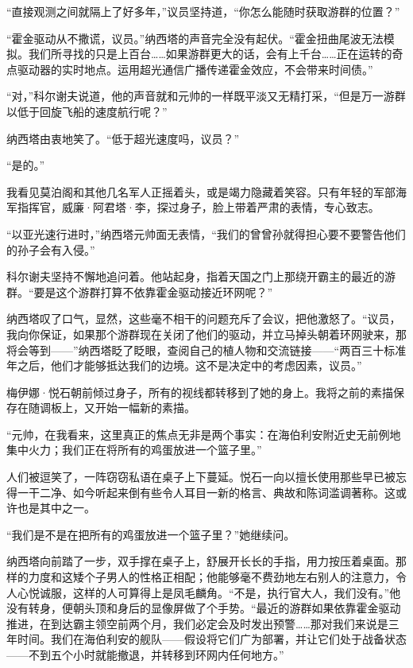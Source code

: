 \documentclass[AutoFakeBold=true]{book}
\begin{document}
``直接观测之间就隔上了好多年，''议员坚持道，``你怎么能随时获取游群的位置？''

``霍金驱动从不撒谎，议员。''纳西塔的声音完全没有起伏。``霍金扭曲尾波无法模拟。我们所寻找的只是上百台……如果游群更大的话，会有上千台……正在运转的奇点驱动器的实时地点。运用超光通信广播传递霍金效应，不会带来时间债。''

``对，''科尔谢夫说道，他的声音就和元帅的一样既平淡又无精打采，``但是万一游群以低于回旋飞船的速度航行呢？''

纳西塔由衷地笑了。``{\kaishu 低于}超光速度吗，议员？''

``是的。''

我看见莫泊阁和其他几名军人正摇着头，或是竭力隐藏着笑容。只有年轻的军部海军指挥官，威廉·阿君塔·李，探过身子，脸上带着严肃的表情，专心致志。

``以亚光速行进时，''纳西塔元帅面无表情，``我们的曾曾孙就得担心要不要警告他们的孙子会有入侵。''

科尔谢夫坚持不懈地追问着。他站起身，指着天国之门上那绕开霸主的最近的游群。``要是这个游群打算不依靠霍金驱动接近环网呢？''

纳西塔叹了口气，显然，这些毫不相干的问题充斥了会议，把他激怒了。``议员，我向你保证，如果那个游群{\kaishu 现在}关闭了他们的驱动，并{\kaishu 立马}掉头朝着环网驶来，那将会等到——''纳西塔眨了眨眼，查阅自己的植人物和交流链接——``两百三十标准年之后，他们才能够抵达我们的边境。这不是决定中的考虑因素，议员。''

梅伊娜·悦石朝前倾过身子，所有的视线都转移到了她的身上。我将之前的素描保存在随调板上，又开始一幅新的素描。

``元帅，在我看来，这里真正的焦点无非是两个事实：在海伯利安附近史无前例地集中火力；我们正在将所有的鸡蛋放进一个篮子里。''

人们被逗笑了，一阵窃窃私语在桌子上下蔓延。悦石一向以擅长使用那些早已被忘得一干二净、如今听起来倒有些令人耳目一新的格言、典故和陈词滥调著称。这或许也是其中之一。

``我们是不是在把所有的鸡蛋放进一个篮子里？''她继续问。

纳西塔向前踏了一步，双手撑在桌子上，舒展开长长的手指，用力按压着桌面。那样的力度和这矮个子男人的性格正相配；他能够毫不费劲地左右别人的注意力，令人心悦诚服，这样的人可算得上是凤毛麟角。``不是，执行官大人，我们没有。''他没有转身，便朝头顶和身后的显像屏做了个手势。``最近的游群如果依靠霍金驱动推进，在到达霸主领空前两个月，我们必定会及时发出预警……那对我们来说是{\kaishu 三年时间}。我们在海伯利安的舰队——假设将它们广为部署，并让它们处于战备状态——不到{\kaishu 五个小时}就能撤退，并转移到环网内任何地方。''
\end{document}
